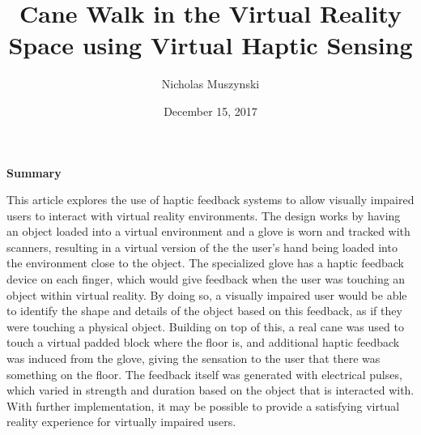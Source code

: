 \documentclass{article}
\begin{document}
\title{Cane Walk in the Virtual Reality Space using Virtual Haptic Sensing}
\author{Nicholas Muszynski}
\date{December 15, 2017}

\maketitle

\textbf{Summary}
\newline

This article explores the use of haptic feedback systems to allow visually impaired users to interact with virtual reality environments. The design works by having an object loaded into a virtual environment and a glove is worn and tracked with scanners, resulting in a virtual version of the the user's hand being loaded into the environment close to the object. The specialized glove has a haptic feedback device on each finger, which would give feedback when the user was touching an object within virtual reality.  By doing so, a visually impaired user would be able to identify the shape and details of the object based on this feedback, as if they were touching a physical object. Building on top of this, a real cane was used to touch a virtual padded block where the floor is, and additional haptic feedback was induced from the glove, giving the sensation to the user that there was something on the floor. The feedback itself was generated with electrical pulses, which varied in strength and duration based on the object that is interacted with. With further implementation, it may be possible to provide a satisfying virtual reality experience for virtually impaired users.

\nocite{visualCite}



\end{document}
